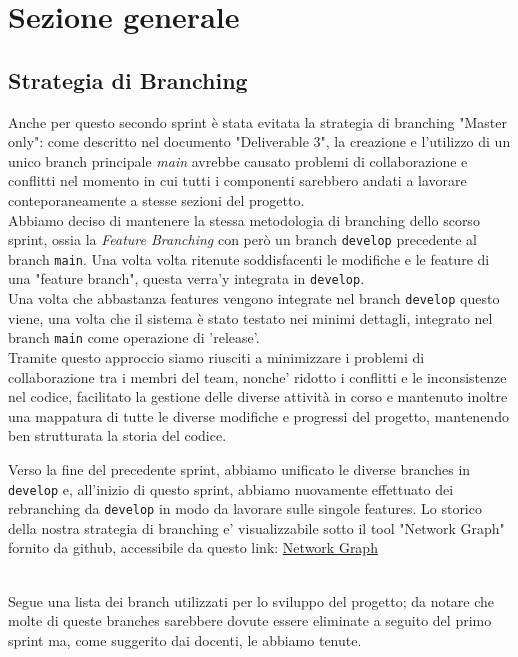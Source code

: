 \documentclass{article}
\begin{document}
\clearpage

\section{Sezione generale}

\subsection{Strategia di Branching}
Anche per questo secondo sprint è stata evitata la strategia di branching "Master only": come descritto nel documento "Deliverable 3", la creazione e l'utilizzo di un unico branch principale \textit{main} avrebbe causato problemi di collaborazione e conflitti nel momento in cui tutti i componenti sarebbero andati a lavorare conteporaneamente a stesse sezioni del progetto. \\

\noindent
Abbiamo deciso di mantenere la stessa metodologia di branching dello scorso sprint, ossia la \textit{Feature Branching} con però un branch \texttt{develop} precedente al branch \texttt{main}. Una volta volta ritenute soddisfacenti le modifiche e le feature di una "feature branch", questa verra'y integrata in \texttt{develop}.\\
Una volta che abbastanza features vengono integrate nel branch \texttt{develop} questo viene, una volta che il sistema è stato testato nei minimi dettagli, integrato nel branch \texttt{main} come operazione di 'release'.\\

\noindent
Tramite questo approccio siamo riusciti a minimizzare i problemi di  collaborazione tra i membri del team, nonche' ridotto i conflitti e le inconsistenze nel codice, facilitato la gestione delle diverse attività in corso e mantenuto inoltre una mappatura di tutte le diverse modifiche e progressi del progetto, mantenendo ben strutturata la storia del codice.

\noindent
Verso la fine del precedente sprint, abbiamo unificato le diverse branches in \texttt{develop} e, all'inizio di questo sprint, abbiamo nuovamente effettuato dei rebranching da \texttt{develop} in modo da lavorare sulle singole features.
Lo storico della nostra strategia di branching e' visualizzabile sotto il tool "Network Graph" fornito da github, accessibile da questo link:
\href{https://github.com/ELI20ZIVI/BeeLive/network}{Network Graph}

\\
\noindent
Segue una lista dei branch utilizzati per lo sviluppo del progetto; da notare che molte di queste branches sarebbere dovute essere eliminate a seguito del primo sprint ma, come suggerito dai docenti, le abbiamo tenute.
\end{document}
